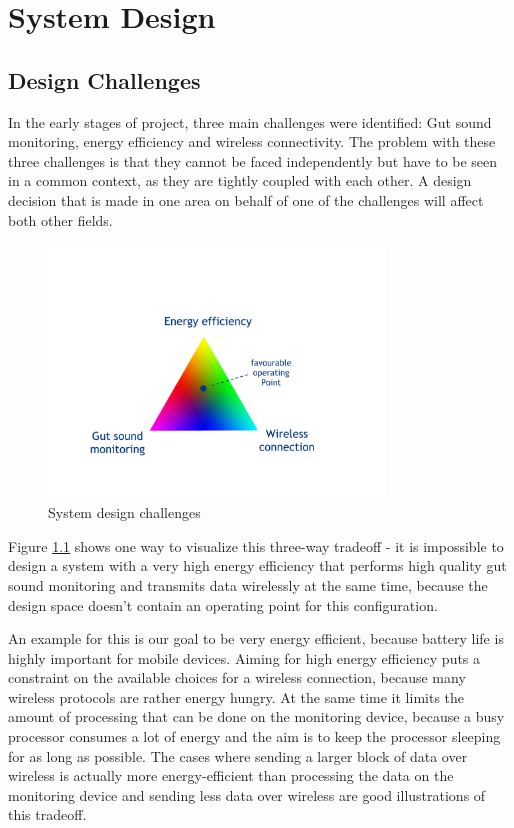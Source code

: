 \chapter{System Design}


\section{Design Challenges}
\label{sec:design_challenges}
In the early stages of project, three main challenges were identified: Gut sound monitoring, energy efficiency and wireless connectivity. The problem with these three challenges is that they cannot be faced independently but have to be seen in a common context, as they are tightly coupled with each other. A design decision that is made in one area on behalf of one of the challenges will affect both other fields. 

\begin{figure}
\centering
\includegraphics[width=0.8\textwidth]{Images/design_challenges}
\caption{System design challenges}
\label{fig:design_challenges}
\end{figure}

Figure \ref{fig:design_challenges} shows one  way to visualize this three-way tradeoff - it is impossible to design a system with a very high energy efficiency that performs high quality gut sound monitoring and transmits data wirelessly at the same time, because the design space doesn't contain an operating point for this configuration. 

An example for this is our goal to be very energy efficient, because battery life is highly important for mobile devices. Aiming for high energy efficiency puts a constraint on the available choices for a wireless connection, because many wireless protocols are rather energy hungry. At the same time it limits the amount of processing that can be done on the monitoring device, because a busy processor consumes a lot of energy and the aim is to keep the processor sleeping for as long as possible. The cases where sending a larger block of data over wireless is actually more energy-efficient than processing the data on the monitoring device and sending less data over wireless are good illustrations of this tradeoff. 

